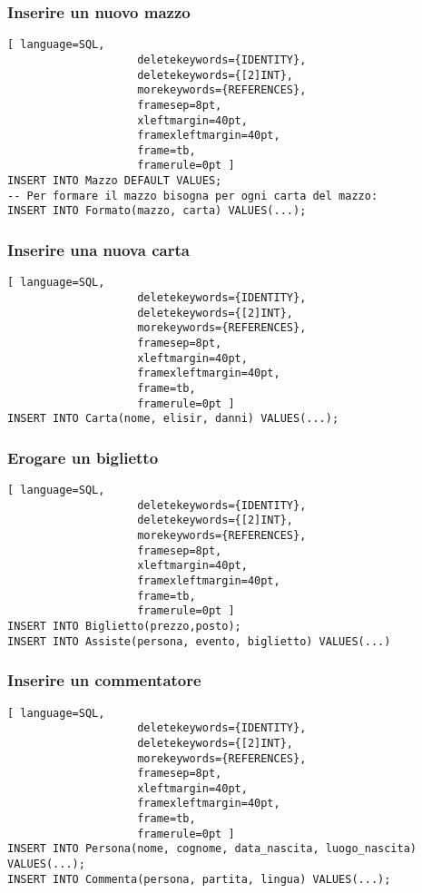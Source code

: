 \documentclass{article}
\begin{document}
\subsubsection{Inserire un nuovo mazzo}
\begin{lstlisting}[ language=SQL,
                    deletekeywords={IDENTITY},
                    deletekeywords={[2]INT},
                    morekeywords={REFERENCES},
                    framesep=8pt,
                    xleftmargin=40pt,
                    framexleftmargin=40pt,
                    frame=tb,
                    framerule=0pt ]
INSERT INTO Mazzo DEFAULT VALUES;
-- Per formare il mazzo bisogna per ogni carta del mazzo:
INSERT INTO Formato(mazzo, carta) VALUES(...);
\end{lstlisting}

\subsubsection{Inserire una nuova carta}
\begin{lstlisting}[ language=SQL,
                    deletekeywords={IDENTITY},
                    deletekeywords={[2]INT},
                    morekeywords={REFERENCES},
                    framesep=8pt,
                    xleftmargin=40pt,
                    framexleftmargin=40pt,
                    frame=tb,
                    framerule=0pt ]
INSERT INTO Carta(nome, elisir, danni) VALUES(...);
\end{lstlisting}

\subsubsection{Erogare un biglietto}
\begin{lstlisting}[ language=SQL,
                    deletekeywords={IDENTITY},
                    deletekeywords={[2]INT},
                    morekeywords={REFERENCES},
                    framesep=8pt,
                    xleftmargin=40pt,
                    framexleftmargin=40pt,
                    frame=tb,
                    framerule=0pt ]
INSERT INTO Biglietto(prezzo,posto);
INSERT INTO Assiste(persona, evento, biglietto) VALUES(...)
\end{lstlisting}

\subsubsection{Inserire un commentatore}
\begin{lstlisting}[ language=SQL,
                    deletekeywords={IDENTITY},
                    deletekeywords={[2]INT},
                    morekeywords={REFERENCES},
                    framesep=8pt,
                    xleftmargin=40pt,
                    framexleftmargin=40pt,
                    frame=tb,
                    framerule=0pt ]
INSERT INTO Persona(nome, cognome, data_nascita, luogo_nascita) VALUES(...);
INSERT INTO Commenta(persona, partita, lingua) VALUES(...);
\end{lstlisting}
\end{document}
